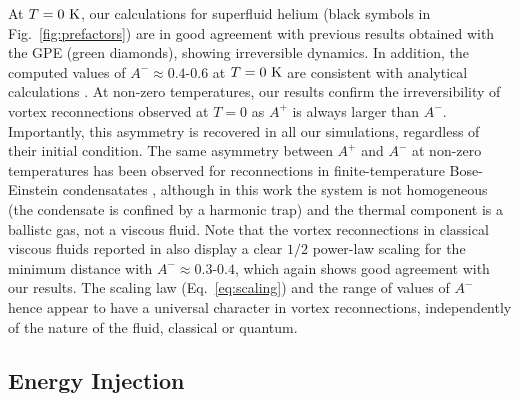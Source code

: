 \documentclass[9pt,twocolumn,twoside]{pnas-new}
\def\red#1{\textcolor{red}{#1}}
\begin{document}
At $T=0~{\rm K}$, our calculations for superfluid helium (black symbols in Fig.~\ref{fig:prefactors}) are in good agreement with previous results obtained with the GPE \cite{villoisIrreversibleDynamicsVortex2020} (green diamonds), showing irreversible dynamics. In addition, the computed values of $A^-\approx 0.4$-$0.6$ at $T=0~{\rm K}$ are consistent with analytical calculations \cite{boue-etal-2013,rica-2019}. At non-zero temperatures, our results confirm the irreversibility of vortex reconnections observed at $T=0$ as $A^+$ is always larger than $A^-$. Importantly, this asymmetry is recovered in all our simulations, regardless of their initial condition.
The same asymmetry between $A^+$ and $A^-$ at non-zero temperatures has been observed for reconnections in finite-temperature
Bose-Einstein condensatates \cite{allen2014}, although in this work the system is not homogeneous (the condensate is confined by a harmonic trap) and the thermal component is a ballistc gas, not a viscous fluid. Note that the vortex reconnections in classical viscous fluids reported in %
\cite{yaoSeparationScalingViscous2020} also display
a clear $1/2$ power-law scaling for the minimum distance
with $A^- \approx 0.3$-$0.4$, which again shows good agreement with our results. The scaling law (Eq.~\ref{eq:scaling}) and the range of values of $A^-$ hence appear to have a universal character in vortex reconnections, independently of the nature of the fluid, classical or quantum.

\subsection*{Energy Injection}
\end{document}
